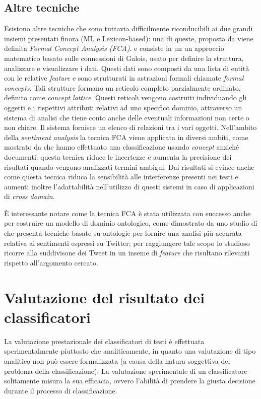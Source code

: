 \documentclass[a4paper,12pt,openright,twoside]{report}
\theoremstyle{definition}
\begin{document}
\subsection{Altre tecniche}
Esistono altre tecniche che sono tuttavia difficilmente riconducibili ai due grandi insiemi presentati finora (ML e Lexicon-based):
una di queste, proposta da \cite{Wille1982} 
viene definita \emph{Formal Concept Analysis (FCA)}.
e consiste in un un approccio matematico basato sulle connessioni
di Galois, usato per definire la struttura, analizzare e visualizzare i dati.
Questi dati sono composti da una lista di entità con le relative \emph{feature} e sono strutturati
in astrazioni formali chiamate \emph{formal concepts}. Tali strutture formano un reticolo completo 
parzialmente ordinato, definito come \emph{concept lattice}. Questi reticoli vengono costruiti
individuando gli oggetti e i rispettivi attributi relativi ad uno specifico dominio, attraverso
un sistema di analisi che tiene conto anche delle eventuali informazioni non certe o non chiare.
Il sistema
fornisce un elenco di relazioni tra i vari oggetti.
Nell'ambito della \emph{sentiment analysis} la tecnica FCA viene applicata in diversi ambiti,
come mostrato da \cite{Li2011}
che hanno effettuato una classificazione usando \emph{concept} anziché documenti: questa tecnica
riduce le incertezze e aumenta la precisione dei risultati quando vengono analizzati termini ambigui.
Dai risultati si evince anche come questa tecnica riduca la sensibilità alle interferenze presenti nei testi
e aumenti inoltre l'adattabilità nell'utilizzo di questi sistemi in caso di applicazioni di \emph{cross domain}.

\`E interessante notare come la tecnica FCA è stata utilizzata con successo
anche per costruire un modello di dominio ontologico, come dimostrato da uno
studio di \cite{Konto2013}
che presenta
tecniche basate su ontologie per fornire una analisi più accurata relativa ai sentimenti espressi
su Twitter; per raggiungere tale scopo lo
studioso ricorre alla suddivisone dei Tweet in un inseme di \emph{feature} che risultano rilevanti
rispetto all'argomento cercato.

\section{Valutazione del risultato dei classificatori}
La valutazione prestazionale dei classificatori di testi è effettuata sperimentalmente
piuttosto che analiticamente, in quanto una valutazione di tipo analitico non può essere
formalizzata (a causa della natura soggettiva del problema della classificazione). La
valutazione sperimentale di un classificatore solitamente misura la sua efficacia, ovvero
l’abilità di prendere la giusta decisione durante il processo di classificazione.
\end{document}
